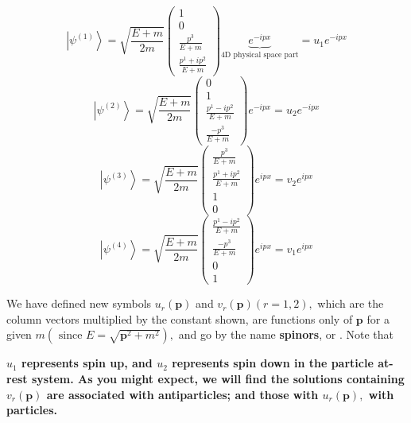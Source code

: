 \begin{qt}
$$
\left|\psi^{(1)}\right\rangle=\sqrt{\frac{E+m}{2 m}}\left(\begin{array}{c}
{1} \\
{0} \\
{\frac{p^{3}}{E+m}} \\
{\frac{p^{1}+i p^{2}}{E+m}}
\end{array}\right)  \underbrace{e^{-i p x}}_{\text {4D physical space part}}=u_1e^{-i p x}
$$
$$
\left|\psi^{(2)}\right\rangle=\sqrt{\frac{E+m}{2 m}}\left(\begin{array}{c}
{0} \\
{1} \\
{\frac{p^{1}-i p^{2}}{E+m}} \\
{\frac{-p^{3}}{E+m}}
\end{array}\right) e^{-i p x}=u_2e^{-i p x}
$$
$$
\left|\psi^{(3)}\right\rangle=\sqrt{\frac{E+m}{2 m}}\left(\begin{array}{c}
{\frac{p^{3}}{E+m}} \\
{\frac{p^{1}+i p^{2}}{E+m}}\\
{1} \\
{0} 
\end{array}\right) e^{i p x}=v_2e^{i p x}
$$
\begin{equation}
\left|\psi^{(4)}\right\rangle=\sqrt{\frac{E+m}{2 m}}\left(\begin{array}{c}
{\frac{p^{1}-i p^{2}}{E+m}}\\
{\frac{-p^{3}}{E+m}} \\
{0} \\
{1} 
\end{array}\right) e^{i p x}=v_1e^{i p x}
\label{four-spinors}
\end{equation}
\end{qt}
We have defined new symbols $u_{r}(\mathbf{p})$ and $v_{r}(\mathbf{p})(r=1,2),$ which are the column vectors multiplied by the constant shown, are functions only of $\mathbf{p}$ for a given $m(\text { since } E=\sqrt{\mathbf{p}^{2}+m^{2}}),$ and go by the name \textbf{spinors}, or \textbf{}. Note that 

\textbf{$u_{1}$ represents spin up, and $u_{2}$ represents spin down in the particle at-rest system. As you might expect, we will find the solutions containing $v_{r}(\mathbf{p})$ are associated with antiparticles; and those with $u_{r}(\mathbf{p}),$ with particles.}

